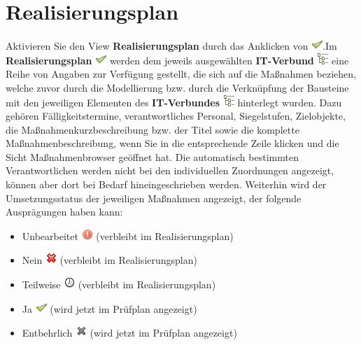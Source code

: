 \documentclass[a4paper,10pt]{book}
\begin{document}
\section{Realisierungsplan}
Aktivieren Sie den View \textbf{Realisierungsplan} durch das Anklicken von \includegraphics[height=2ex]{Icon/Okay.png}.Im \textbf{Realisierungsplan} \includegraphics[height=2ex]{Icon/Okay.png} werden dem jeweils ausgewählten \textbf{IT-Verbund} \includegraphics[height=2ex]{Icon/GS_Modell.png} eine Reihe von Angaben zur Verfügung gestellt, die sich auf die Maßnahmen beziehen, welche zuvor durch die Modellierung bzw. durch die Verknüpfung der Bausteine mit den jeweiligen Elementen des \textbf{IT-Verbundes} \includegraphics[height=2ex]{Icon/GS_Modell.png} hinterlegt wurden. Dazu gehören Fälligkeitstermine, verantwortliches Personal, Siegelstufen, Zielobjekte, die Maßnahmenkurzbeschreibung bzw. der Titel sowie die komplette Maßnahmenbeschreibung, wenn Sie in die entsprechende Zeile klicken und die Sicht Maßnahmenbrowser geöffnet hat. Die automatisch bestimmten Verantwortlichen werden nicht bei den individuellen Zuordnungen angezeigt, können aber dort bei Bedarf hineingeschrieben werden. Weiterhin wird der
Umsetzungsstatus der jeweiligen Maßnahmen angezeigt, der folgende Ausprägungen haben kann:
\begin{itemize}
 \item Unbearbeitet \includegraphics[height=2ex]{Icon/Unbearbeitet.png} (verbleibt im Realisierungsplan)
 \item Nein \includegraphics[height=2ex]{Icon/Nein.png} (verbleibt im Realisierungsplan)
 \item Teilweise \includegraphics[height=2ex]{Icon/Teilweise.png} (verbleibt im Realisierungsplan)
 \item Ja \includegraphics[height=2ex]{Icon/Okay.png} (wird jetzt im Prüfplan angezeigt)
 \item Entbehrlich \includegraphics[height=2ex]{Icon/Entbehrlich.png} (wird jetzt im Prüfplan angezeigt)
\end{itemize}
\end{document}
